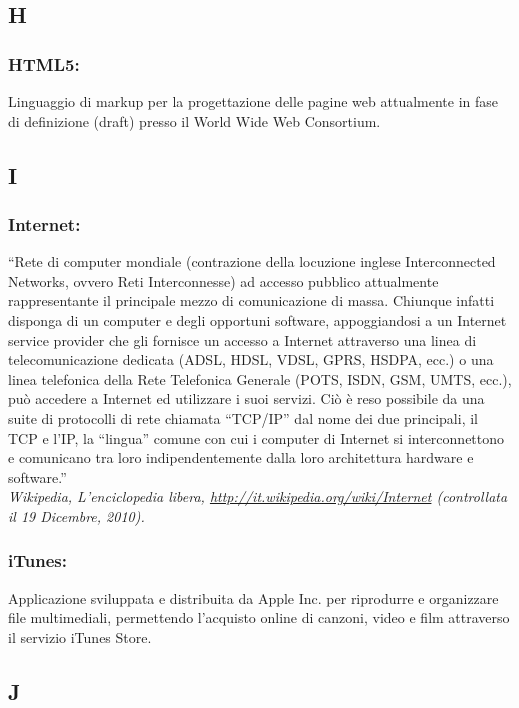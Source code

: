 \subsection*{\huge{H}}
\subsubsection*{HTML5:} Linguaggio di markup per la progettazione delle pagine
web attualmente in fase di definizione (draft) presso il World Wide Web Consortium.

\subsection*{\huge{I}}
\subsubsection*{Internet:}  ``Rete di computer mondiale (contrazione della
locuzione inglese Interconnected Networks, ovvero Reti Interconnesse) ad accesso pubblico
attualmente rappresentante il principale mezzo di comunicazione di massa.
Chiunque infatti disponga di un computer e degli opportuni software,
appoggiandosi a un Internet service provider che gli fornisce un accesso a
Internet attraverso una linea di telecomunicazione dedicata (ADSL, HDSL, VDSL,
GPRS, HSDPA, ecc.) o una linea telefonica della Rete Telefonica Generale (POTS,
ISDN, GSM, UMTS, ecc.), pu\`o accedere a Internet ed utilizzare i suoi servizi.
Ci\`o \`e reso possibile da una suite di protocolli di rete chiamata ``TCP/IP'' dal
nome dei due principali, il TCP e l'IP, la ``lingua'' comune con cui i computer
di Internet si interconnettono e comunicano tra loro indipendentemente dalla loro
architettura hardware e software.'' \\ 
\emph{Wikipedia, L'enciclopedia libera,
\url{http://it.wikipedia.org/wiki/Internet} (controllata il 19 Dicembre, 2010).}

\subsubsection*{iTunes:} Applicazione sviluppata e distribuita da Apple Inc. per
riprodurre e organizzare file multimediali, permettendo l'acquisto online di canzoni, video e
film attraverso il servizio iTunes Store.

\subsection*{\huge{J}}
